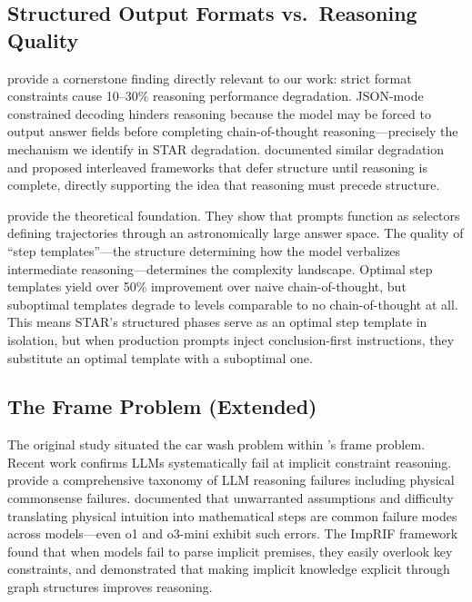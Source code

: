 \documentclass[11pt]{article}
\begin{document}
\subsection{Structured Output Formats vs.\ Reasoning Quality}

\citet{tam2024} provide a cornerstone finding directly relevant to our work: strict format constraints cause 10--30\% reasoning performance degradation. JSON-mode constrained decoding hinders reasoning because the model may be forced to output answer fields before completing chain-of-thought reasoning---precisely the mechanism we identify in STAR degradation. \citet{banerjee2025} documented similar degradation and proposed interleaved frameworks that defer structure until reasoning is complete, directly supporting the idea that reasoning must precede structure.

\citet{zhang2025} provide the theoretical foundation. They show that prompts function as selectors defining trajectories through an astronomically large answer space. The quality of ``step templates''---the structure determining how the model verbalizes intermediate reasoning---determines the complexity landscape. Optimal step templates yield over 50\% improvement over naive chain-of-thought, but suboptimal templates degrade to levels comparable to no chain-of-thought at all. This means STAR's structured phases serve as an optimal step template in isolation, but when production prompts inject conclusion-first instructions, they substitute an optimal template with a suboptimal one.

\subsection{The Frame Problem (Extended)}

The original study situated the car wash problem within \citeauthor{mccarthy1969}'s \citeyearpar{mccarthy1969} frame problem. Recent work confirms LLMs systematically fail at implicit constraint reasoning. \citet{song2026} provide a comprehensive taxonomy of LLM reasoning failures including physical commonsense failures. \citet{boye2025} documented that unwarranted assumptions and difficulty translating physical intuition into mathematical steps are common failure modes across models---even o1 and o3-mini exhibit such errors. The ImpRIF framework \citep{imprif2026} found that when models fail to parse implicit premises, they easily overlook key constraints, and \citet{han2025} demonstrated that making implicit knowledge explicit through graph structures improves reasoning.
\end{document}
